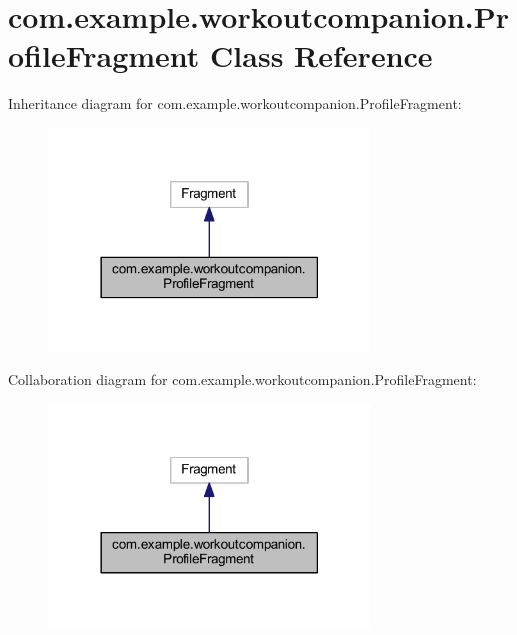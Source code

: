 \hypertarget{classcom_1_1example_1_1workoutcompanion_1_1_profile_fragment}{\section{com.\-example.\-workoutcompanion.\-Profile\-Fragment Class Reference}
\label{classcom_1_1example_1_1workoutcompanion_1_1_profile_fragment}
}


Inheritance diagram for com.\-example.\-workoutcompanion.\-Profile\-Fragment\-:\nopagebreak
\begin{figure}[H]
\begin{center}
\leavevmode
\includegraphics[width=242pt]{classcom_1_1example_1_1workoutcompanion_1_1_profile_fragment__inherit__graph}
\end{center}
\end{figure}


Collaboration diagram for com.\-example.\-workoutcompanion.\-Profile\-Fragment\-:\nopagebreak
\begin{figure}[H]
\begin{center}
\leavevmode
\includegraphics[width=242pt]{classcom_1_1example_1_1workoutcompanion_1_1_profile_fragment__coll__graph}
\end{center}
\end{figure}
